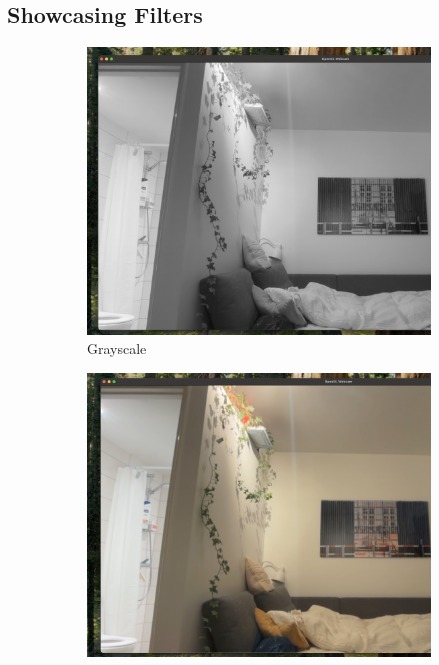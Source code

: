 \documentclass[12pt,a4paper]{article}
\begin{document}
\subsection{Showcasing Filters}
\begin{figure}[H]
    \centering
    \begin{subfigure}[b]{0.32\textwidth}
        \centering
        \includegraphics[width=\textwidth]{filters/grey.png}
        \caption{Grayscale}
        \label{fig:filter_grayscale}
    \end{subfigure}
    \hfill
    \begin{subfigure}[b]{0.32\textwidth}
        \centering
        \includegraphics[width=\textwidth]{filters/gblur.png}

\end{subfigure}
\end{figure}
\end{document}
